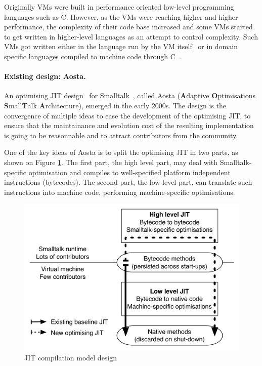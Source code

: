 \documentclass[a4paper,12pt,twoside]{../includes/ThesisStyle}
\begin{document}
Originally VMs were built in performance oriented low-level programming languages such as C. However, as the VMs were reaching higher and higher performance, the complexity of their code base increased and some VMs started to get written in higher-level languages as an attempt to control complexity. Such VMs got written either in the language run by the VM itself~\cite{Unga05b,Wimm13a,Alp99a} or in domain specific languages compiled to machine code through C~\cite{Rigo06a,Inga97a}.

\paragraph{Existing design: Aosta.}

An optimising JIT design~\cite{Mira02c} for Smalltalk~\cite{Gold83a}, called Aosta (\textbf{A}daptive \textbf{O}ptimisations \textbf{S}mall\textbf{T}alk \textbf{A}rchitecture), emerged in the early 2000s. The design is the convergence of multiple ideas to ease the development of the optimising JIT, to ensure that the maintainance and evolution cost of the resulting implementation is going to be reasonnable and to attract contributors from the community.

One of the key ideas of Aosta is to split the optimising JIT in two parts, as shown on Figure \ref{fig:ExistingDesign}. The first part, the high level part, may deal with Smalltalk-specific optimisation and compiles to well-specified platform independent instructions (bytecodes). The second part, the low-level part, can translate such instructions into machine code, performing machine-specific optimisations.

\begin{figure}[h!]
    \begin{center}
        \includegraphics[width=0.8\linewidth]{ExistingDesign}
        \caption{JIT compilation model design}
        \label{fig:ExistingDesign}
    \end{center}
\end{figure}
\end{document}
